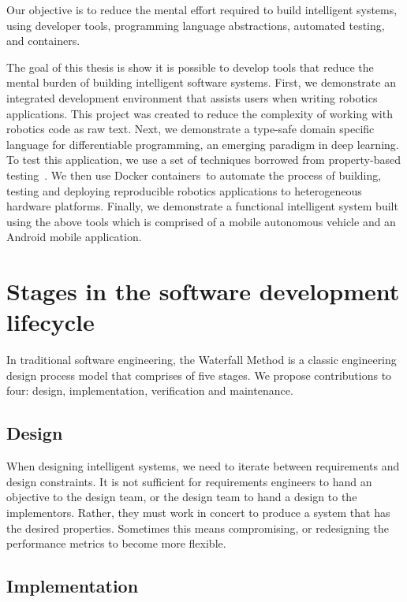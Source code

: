 \documentclass[12pt,initial,twoside,maitrise]{dms}
\numberwithin{equation}{section}
\numberwithin{table}{chapter}
\numberwithin{figure}{chapter}
\begin{document}
Our objective is to reduce the mental effort required to build intelligent systems, using developer tools, programming language abstractions, automated testing, and containers.

The goal of this thesis is show it is possible to develop tools that reduce the mental burden of building intelligent software systems. First, we demonstrate an integrated development environment that assists users when writing robotics applications. This project was created to reduce the complexity of working with robotics code as raw text. Next, we demonstrate a type-safe domain specific language for differentiable programming, an emerging paradigm in deep learning. To test this application, we use a set of techniques borrowed from property-based testing~\cite{fink1997property}. We then use Docker containers~\cite{white2017ros}to automate the process of building, testing and deploying reproducible robotics applications to heterogeneous hardware platforms. Finally, we demonstrate a functional intelligent system built using the above tools which is comprised of a mobile autonomous vehicle and an Android mobile application.

\section{Stages in the software development lifecycle}\label{sec:sldc-stages}

In traditional software engineering, the Waterfall Method is a classic engineering design process model that comprises of five stages. We propose contributions to four: design, implementation, verification and maintenance.

\subsection{Design}

When designing intelligent systems, we need to iterate between requirements and design constraints. It is not sufficient for requirements engineers to hand an objective to the design team, or the design team to hand a design to the implementors. Rather, they must work in concert to produce a system that has the desired properties. Sometimes this means compromising, or redesigning the performance metrics to become more flexible.

\subsection{Implementation}
\end{document}

